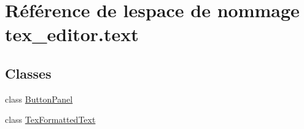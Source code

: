 \hypertarget{namespacetex__editor_1_1text}{}\section{Référence de l\textquotesingle{}espace de nommage tex\+\_\+editor.\+text}
\label{namespacetex__editor_1_1text}
\subsection*{Classes}
\begin{DoxyCompactItemize}
\item 
class \hyperlink{classtex__editor_1_1text_1_1_button_panel}{Button\+Panel}
\item 
class \hyperlink{classtex__editor_1_1text_1_1_tex_formatted_text}{Tex\+Formatted\+Text}
\end{DoxyCompactItemize}
